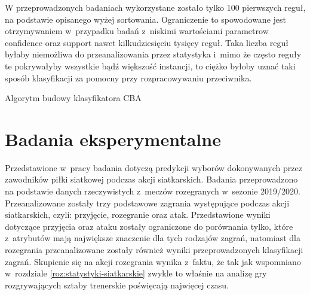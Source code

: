 \documentclass[a4paper,twoside,12pt]{book}
\newenvironment{algorytm}[1][]
  {\renewcommand{\algorithmcfname}{Algorytm}%
   \begin{algorithm}[#1]%
  }{\end{algorithm}}
\begin{document}
W przeprowadzonych badaniach wykorzystane zostało tylko 100 pierwszych reguł, na podstawie opisanego wyżej sortowania. Ograniczenie to spowodowane jest otrzymywaniem w~przypadku badań z~niskimi wartościami parametrow confidence oraz support nawet kilkudziesięciu tysięcy reguł. Taka liczba reguł byłaby niemożliwa do przeanalizowania przez statystyka i~mimo że często reguły te pokrywałyby wszystkie bądź większość instancji, to ciężko byłoby uznać taki sposób klasyfikacji za pomocny przy rozpracowywaniu przeciwnika.

\begin{algorytm}
\label{alg:cba}
\caption{Algorytm budowy klasyfikatora CBA}
\end{algorytm}

\chapter{Badania eksperymentalne}
\label{roz:badania}

Przedstawione w~pracy badania dotyczą predykcji wyborów dokonywanych przez zawodników piłki siatkowej podczas akcji siatkarskich. Badania przeprowadzono na podstawie danych rzeczywistych z~meczów rozegranych w~sezonie 2019/2020. Przeanalizowane zostały trzy podstawowe zagrania występujące podczas akcji siatkarskich, czyli: przyjęcie, rozegranie oraz atak. Przedstawione wyniki dotyczące przyjęcia oraz ataku zostały ograniczone do porównania tylko, które z~atrybutów mają największe znaczenie dla tych rodzajów zagrań, natomiast dla rozegrania przeanalizowane zostały również wyniki przeprowadzonych klasyfikacji zagrań. Skupienie się na akcji rozegrania wynika z~faktu, że tak jak wspomniano w~rozdziale \ref{roz:statystyki-siatkarskie} zwykle to właśnie na analizę gry rozgrywających sztaby trenerskie poświęcają najwięcej czasu.
\end{document}
